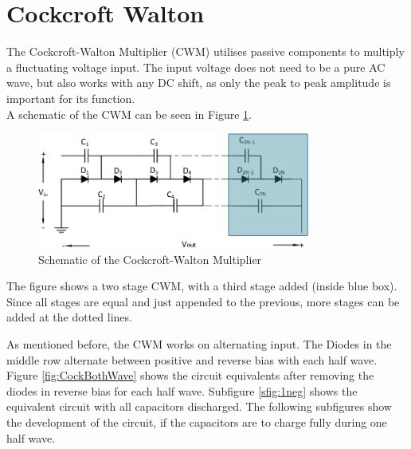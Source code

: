 \section{Cockcroft Walton}\label{ch:cock}
The Cockcroft-Walton Multiplier (CWM) utilises passive components to multiply a fluctuating voltage input.
The input voltage does not need to be a pure AC wave,
but also works with any DC shift,
as only the peak to peak amplitude is important for its function.\cite{Cockcroft1932}\\
A schematic of the CWM can be seen in Figure \ref{fig:CWM}.\\

\begin{figure}[H]
   \centering
   \includegraphics[width=0.8\textwidth]{figures/xCockroftWalton/CockroftWalton.pdf}
    \caption{Schematic of the Cockcroft-Walton Multiplier}
	\label{fig:CWM}
\end{figure}

The figure shows a two stage CWM,
with a third stage added (inside blue box).
Since all stages are equal and just appended to the previous,
more stages can be added at the dotted lines.

As mentioned before,
the CWM works on alternating input.
The Diodes in the middle row alternate between positive and reverse bias with each half wave.
Figure \ref{fig:CockBothWave} shows the circuit equivalents after removing the diodes in reverse bias for each half wave.
Subfigure \ref{sfig:1neg} shows the equivalent circuit with all capacitors discharged.
The following subfigures show the development of the circuit,
if the capacitors are to charge fully during one half wave.

